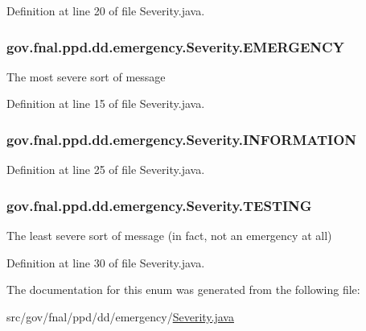 Definition at line 20 of file Severity.\-java.

\hypertarget{enumgov_1_1fnal_1_1ppd_1_1dd_1_1emergency_1_1Severity_a611bc0cf1463a7419a9d2cd14c683578}{
\subsubsection[{E\-M\-E\-R\-G\-E\-N\-C\-Y}]{\setlength{\rightskip}{0pt plus 5cm}gov.\-fnal.\-ppd.\-dd.\-emergency.\-Severity.\-E\-M\-E\-R\-G\-E\-N\-C\-Y}}\label{enumgov_1_1fnal_1_1ppd_1_1dd_1_1emergency_1_1Severity_a611bc0cf1463a7419a9d2cd14c683578}
The most severe sort of message 

Definition at line 15 of file Severity.\-java.

\hypertarget{enumgov_1_1fnal_1_1ppd_1_1dd_1_1emergency_1_1Severity_aaf755550765aa7e569baf503397ecd12}{
\subsubsection[{I\-N\-F\-O\-R\-M\-A\-T\-I\-O\-N}]{\setlength{\rightskip}{0pt plus 5cm}gov.\-fnal.\-ppd.\-dd.\-emergency.\-Severity.\-I\-N\-F\-O\-R\-M\-A\-T\-I\-O\-N}}\label{enumgov_1_1fnal_1_1ppd_1_1dd_1_1emergency_1_1Severity_aaf755550765aa7e569baf503397ecd12}


Definition at line 25 of file Severity.\-java.

\hypertarget{enumgov_1_1fnal_1_1ppd_1_1dd_1_1emergency_1_1Severity_ac5e5ede059fb831322252943bb24a7d5}{
\subsubsection[{T\-E\-S\-T\-I\-N\-G}]{\setlength{\rightskip}{0pt plus 5cm}gov.\-fnal.\-ppd.\-dd.\-emergency.\-Severity.\-T\-E\-S\-T\-I\-N\-G}}\label{enumgov_1_1fnal_1_1ppd_1_1dd_1_1emergency_1_1Severity_ac5e5ede059fb831322252943bb24a7d5}
The least severe sort of message (in fact, not an emergency at all) 

Definition at line 30 of file Severity.\-java.



The documentation for this enum was generated from the following file\-:\begin{DoxyCompactItemize}
\item 
src/gov/fnal/ppd/dd/emergency/\hyperlink{Severity_8java}{Severity.\-java}\end{DoxyCompactItemize}
